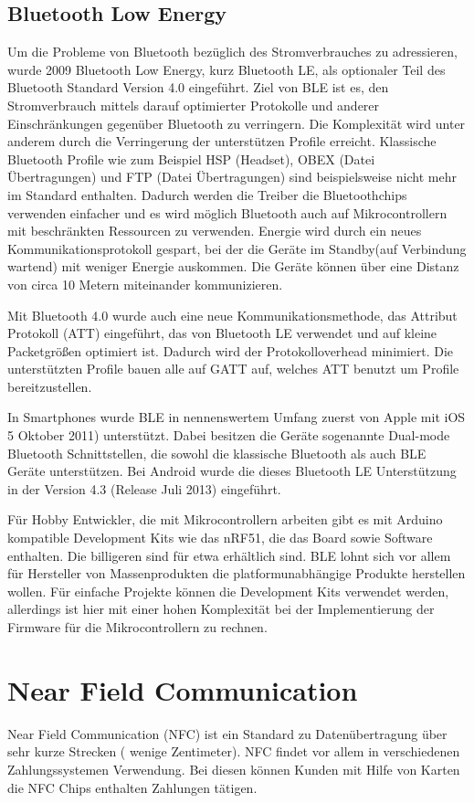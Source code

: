 \documentclass[12pt,journal,compsoc]{IEEEtran}
\begin{document}
\subsection{Bluetooth Low Energy}
Um die Probleme von Bluetooth bezüglich des Stromverbrauches zu adressieren, wurde 2009 Bluetooth Low Energy, kurz Bluetooth LE, als optionaler Teil des Bluetooth Standard Version 4.0 eingeführt.  
Ziel von BLE ist es, den Stromverbrauch mittels darauf optimierter Protokolle und anderer Einschränkungen gegenüber Bluetooth zu verringern.
Die Komplexität wird unter anderem durch die Verringerung der unterstützen Profile erreicht. Klassische Bluetooth Profile wie zum Beispiel HSP (Headset), OBEX (Datei Übertragungen) und FTP (Datei Übertragungen) sind beispielsweise nicht mehr im Standard enthalten.
Dadurch werden die Treiber die Bluetoothchips verwenden einfacher und es wird möglich Bluetooth auch auf Mikrocontrollern mit beschränkten Ressourcen zu verwenden.
Energie wird durch ein neues Kommunikationsprotokoll gespart, bei der die Geräte im Standby(auf Verbindung wartend) mit weniger Energie auskommen.
Die Geräte können über eine Distanz von circa 10 Metern miteinander kommunizieren.

Mit Bluetooth 4.0 wurde auch eine neue Kommunikationsmethode, das Attribut Protokoll (ATT) eingeführt, das von Bluetooth LE verwendet und auf kleine Packetgrößen optimiert ist. 
Dadurch wird der Protokolloverhead minimiert.
Die unterstützten Profile bauen alle auf GATT auf, welches ATT benutzt um Profile bereitzustellen.

In Smartphones wurde BLE in nennenswertem Umfang zuerst von Apple mit iOS 5  Oktober 2011) unterstützt.
Dabei besitzen die Geräte sogenannte Dual-mode Bluetooth Schnittstellen, die sowohl die klassische Bluetooth als auch BLE Geräte unterstützen.
Bei Android wurde die dieses Bluetooth LE Unterstützung in der Version 4.3 (Release Juli 2013) eingeführt.

Für Hobby Entwickler, die mit Mikrocontrollern arbeiten gibt es mit Arduino kompatible Development Kits wie das nRF51, die das Board sowie Software enthalten.
Die billigeren sind für etwa  erhältlich sind.
BLE lohnt sich vor allem für Hersteller von Massenprodukten die platformunabhängige Produkte herstellen wollen.
Für einfache Projekte können die Development Kits verwendet werden, allerdings ist hier mit einer hohen Komplexität bei der Implementierung der Firmware für die Mikrocontrollern zu rechnen.

\section{Near Field Communication}
Near Field Communication (NFC) ist ein Standard zu Datenübertragung über sehr kurze Strecken ( wenige Zentimeter). 
NFC findet vor allem in verschiedenen Zahlungssystemen Verwendung.
Bei diesen können Kunden mit Hilfe von Karten die NFC Chips enthalten Zahlungen tätigen.
\end{document}
